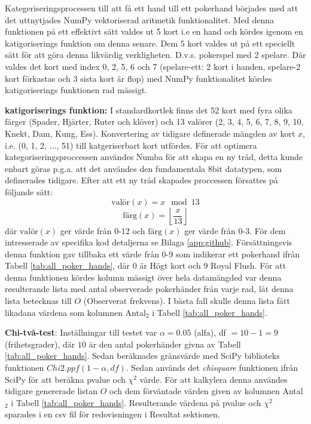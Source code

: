 \documentclass[swedish,a4paper]{article}
\begin{document}
\noindent
Kategeriseringsprocessen till att få ett hand till ett pokerhand börjades med
att det uttnytjades NumPy vektoriserad aritmetik funktionalitet. Med denna
funktionen på ett effektivt sätt valdes ut 5 kort i.e en hand och kördes igenom
en katigoriserings funktion om denna senare. Dem 5 kort valdes ut på ett
speciellt sätt för att göra denna likvärdig verkligheten. D.v.s. pokerspel med 2
spelare. Där valdes det kort med index 0, 2, 5, 6 och 7 (spelare-ett:  2 kort i
handen, spelare-2 kort förkastas och 3 sista kort är flop) med NumPy funktionalitet
kördes katigoriserings funktionen rad mässigt.

\textbf{katigoriserings funktion:}
I standardkortlek finns det 52 kort med fyra olika 
färger (Spader, Hjärter, Ruter och klöver) och 13 valörer 
(2, 3, 4, 5, 6, 7, 8, 9, 10, Knekt, Dam, Kung, Ess). Konvertering av tidigare
definerade mängden av kort $x$, i.e. (0, 1, 2, $\dots$, 51) till katgeriserbart
kort utfördes. För att optimera kategoriseringsproccessen användes Numba för att skapa en
ny tråd, detta kunde enbart göras p.g.a. att det användes den fundamentala 8bit
datatypen, som definerades tidigare. Efter att ett ny tråd skapades proccessen
försattes på följande sätt: 
\begin{equation*}
    \text{valör}(x) = x \mod 13
\end{equation*}
\begin{equation*}
    \text{färg}(x) = \left\lfloor \frac{x}{13} \right\rfloor
\end{equation*}
där $\text{valör}(x)$ ger värde från 0-12 och $\text{färg}(x)$ ger värde från
0-3. För dem intresserade av specifika kod detaljerna se Bilaga
\ref{app:github}. Försättningsvis denna funktion gav tillbaka ett värde från
0-9 som indikerar ett pokerhand ifrån Tabell \ref{tab:all_poker_hands}, där 0 är
Högt kort och 9 Royal Flush. För att denna funktionen kördes kolumn mässigt över
hela datamängded var denna resulterande 
lista med antal observerade pokerhänder från varje rad, låt denna lista betecknas till
$O$ (Observerat frekvens). I bästa fall skulle denna lista
fått likadana värdena som kolumnen Antal$_2$ i Tabell \ref{tab:all_poker_hands}.


\textbf{Chi-två-test}: Inställningar till testet var $\alpha = 0.05$
(\gls{alfa}), df $= 10 -
1 = 9$ (frihetsgrader), där $10$ är den antal pokerhänder givna av Tabell
\ref{tab:all_poker_hands}. Sedan beräknades gränsvärde med SciPy \gls{bibliotek}s
funktionen $Chi2.ppf( 1 - \alpha, df)$. Sedan används det \textit{chisquare}
funktionen ifrån SciPy för att beräkna \gls{pvalue} och $\chi^2$ värde. För att
kalkylera denna användes tidigare genererade listan $O$ och dem förväntade värden given av
kolumnen Antal$_2$ i Tabell \ref{tab:all_poker_hands}. Resulterande värdena på
\gls{pvalue} och $\chi^2$ sparades i en csv fil för redovisningen i Resultat
sektionen.
\end{document}
